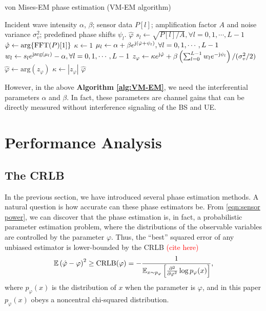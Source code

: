\documentclass[12pt,draftclsnofoot,journal,onecolumn]{IEEEtran}
\theoremstyle{nonumberplain}
\def \arg {\text{arg}}
\def \ch {\textcolor{red}{(cite here) }}
\begin{document}
    \begin{algorithm}[H] 
        \caption{von Mises-EM phase estimation (VM-EM algorithm)} \label{alg:VM-EM}
        \begin{algorithmic}[1]
            \REQUIRE Incident wave intensity $\alpha$, $\beta$; sensor data $P[l]$; amplification factor $A$ and noise variance $\sigma_v^2$; predefined phase shifts $\psi_l$.
            \ENSURE $\hat{\varphi}$
            \STATE $s_l \leftarrow \sqrt{P[l]/A}, \forall l=0,1,\cdots,L-1$
            \STATE $\hat{\varphi} \leftarrow \arg\{{\rm FFT}(P)[1]\}$
            \STATE $\kappa \leftarrow 1$
                \STATE $\mu_l \leftarrow \alpha + \beta e^{{\rm j} (\hat{\varphi}+\psi_l)}, \forall l=0,1,\cdots,L-1$
                \STATE $w_l \leftarrow s_l e^{{\rm j} \arg(\mu_l)} - \alpha, \forall l=0,1,\cdots,L-1$
                \STATE $z_\varphi \leftarrow \kappa e^{{\rm j} \hat{\varphi}} + \beta \left( \sum_{l=0}^{L-1}{w_l e^{-{\rm j} \psi_l}}\right) / (\sigma_v^2/2)$
                \STATE $\hat{\varphi} \leftarrow \arg(z_\varphi)$
                \STATE $\kappa \leftarrow |z_\varphi|$
            \ENDWHILE
            \RETURN $\hat{\varphi}$
        \end{algorithmic}
    \end{algorithm}

    However, in the above {\bf Algorithm \ref{alg:VM-EM}}, we need the interferential parameters $\alpha$ and $\beta$. In fact, these parameters are channel gains that can be directly measured without interference signaling of the BS and UE. 
    
\section{Performance Analysis}
\label{Performance Analysis}
\subsection{The CRLB}
    In the previous section, we have introduced several phase estimation methods. A natural question is how accurate can these phase estimators be. From \eqref{eqn:sensor power}, we can discover that the phase estimation is, in fact, a probabilistic parameter estimation problem, where the distributions of the observable variables are controlled by the parameter $\varphi$. Thus, the ``best'' squared error of any unbiased estimator is lower-bounded by the CRLB \ch 
    \begin{equation}
        \mathbb{E}\left(\hat{\varphi}-\varphi\right)^2 \geq {\rm CRLB}(\varphi) = -\frac{1}{\mathbb{E}_{x\sim p_\varphi}\left[\frac{\partial^2}{\partial\varphi^2}\log p_{\varphi}(x)\right]},
        \label{eqn:CRLB definition}
    \end{equation}
    where $p_{\varphi}(x)$ is the distribution of $x$ when the parameter is $\varphi$, and in this paper $p_{\varphi}(x)$ obeys a noncentral chi-squared distribution. 
\end{document}

